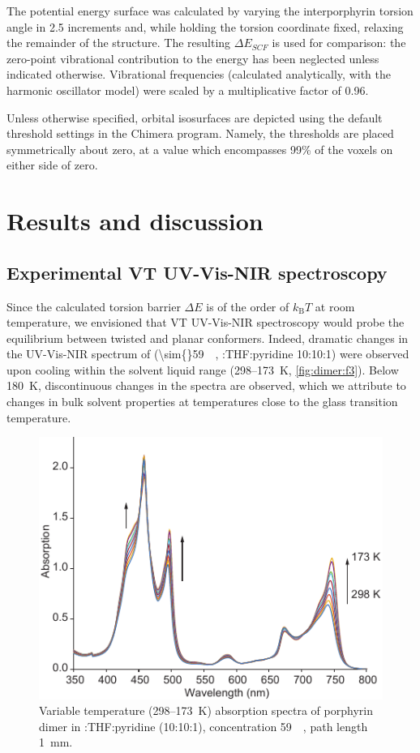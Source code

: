 		The potential energy surface was calculated by varying the interporphyrin torsion angle in 2.5\textdegree{} increments and, while holding the torsion coordinate fixed, relaxing the remainder of the structure. The resulting $\Delta E_{SCF}$ is used for comparison: the zero-point vibrational contribution to the energy has been neglected unless indicated otherwise. Vibrational frequencies (calculated analytically, with the harmonic oscillator model) were scaled by a multiplicative factor of 0.96.

		Unless otherwise specified, orbital isosurfaces are depicted using the default threshold settings in the Chimera\autocite{pettersen2004ucsf} program. Namely, the thresholds are placed symmetrically about zero, at a value which encompasses 99\% of the voxels on either side of zero. 


\section{Results and discussion}
	\subsection{Experimental VT UV-Vis-NIR spectroscopy}

		Since the calculated torsion barrier $\Delta E$ is of the order of $k_{\text{B}} T$ at room temperature, we envisioned that VT UV-Vis-NIR spectroscopy would probe the equilibrium between twisted and planar conformers. Indeed, dramatic changes in the UV-Vis-NIR spectrum of  (\SI{\sim{}59}{\micro\Molar}, :THF:pyridine 10:10:1) were observed upon cooling within the solvent liquid range (298–\SI{173}{\kelvin}, \autoref{fig:dimer:f3}). Below \SI{180}{\kelvin}, discontinuous changes in the spectra are observed, which we attribute to changes in bulk solvent properties at temperatures close to the glass transition temperature.\autocite{Bublitz1998}

		\begin{figure}[ht!]
			\centering\includegraphics{figures/dimer/Figure-3.pdf} 
			\caption[]{Variable temperature (298–\SI{173}{\kelvin}) absorption spectra of porphyrin dimer  in :THF:pyridine (10:10:1), concentration  \SI{59}{\micro\Molar}, path length \SI{1}{\milli\metre}.}
			\label{fig:dimer:f3}
		\end{figure}


